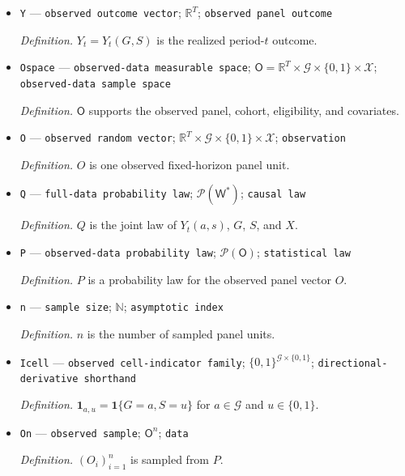 \documentclass{article}
\begin{document}
\begin{itemize}
  \par\smallskip\noindent\emph{Definition.} \(\mathsf W^*\) supports the potential-outcome array, cohort, eligibility, and covariates.
  \item \texttt{Y} --- \texttt{observed outcome vector}; \(\mathbb R^T\); \texttt{observed panel outcome}
  \par\smallskip\noindent\emph{Definition.} \(Y_t=Y_t(G,S)\) is the realized period-\(t\) outcome.
  \item \texttt{Ospace} --- \texttt{observed-\allowbreak{}data measurable space}; \(\mathsf O=\mathbb R^T\times\mathcal G\times\{0,1\}\times\mathcal X\); \texttt{observed-\allowbreak{}data sample space}
  \par\smallskip\noindent\emph{Definition.} \(\mathsf O\) supports the observed panel, cohort, eligibility, and covariates.
  \item \texttt{O} --- \texttt{observed random vector}; \(\mathbb R^T\times\mathcal G\times\{0,1\}\times\mathcal X\); \texttt{observation}
  \par\smallskip\noindent\emph{Definition.} \(O\) is one observed fixed-horizon panel unit.
  \item \texttt{Q} --- \texttt{full-\allowbreak{}data probability law}; \(\mathcal P(\mathsf W^*)\); \texttt{causal law}
  \par\smallskip\noindent\emph{Definition.} \(Q\) is the joint law of \(Y_t(a,s)\), \(G\), \(S\), and \(X\).
  \item \texttt{P} --- \texttt{observed-\allowbreak{}data probability law}; \(\mathcal P(\mathsf O)\); \texttt{statistical law}
  \par\smallskip\noindent\emph{Definition.} \(P\) is a probability law for the observed panel vector \(O\).
  \item \texttt{n} --- \texttt{sample size}; \(\mathbb N\); \texttt{asymptotic index}
  \par\smallskip\noindent\emph{Definition.} \(n\) is the number of sampled panel units.
  \item \texttt{Icell} --- \texttt{observed cell-\allowbreak{}indicator family}; \(\{0,1\}^{\mathcal G\times\{0,1\}}\); \texttt{directional-\allowbreak{}derivative shorthand}
  \par\smallskip\noindent\emph{Definition.} \(\mathbf 1_{a,u}=\mathbf 1\{G=a,S=u\}\) for \(a\in\mathcal G\) and \(u\in\{0,1\}\).
  \item \texttt{On} --- \texttt{observed sample}; \(\mathsf O^n\); \texttt{data}
  \par\smallskip\noindent\emph{Definition.} \((O_i)_{i=1}^n\) is sampled from \(P\).

\end{itemize}
\end{document}
